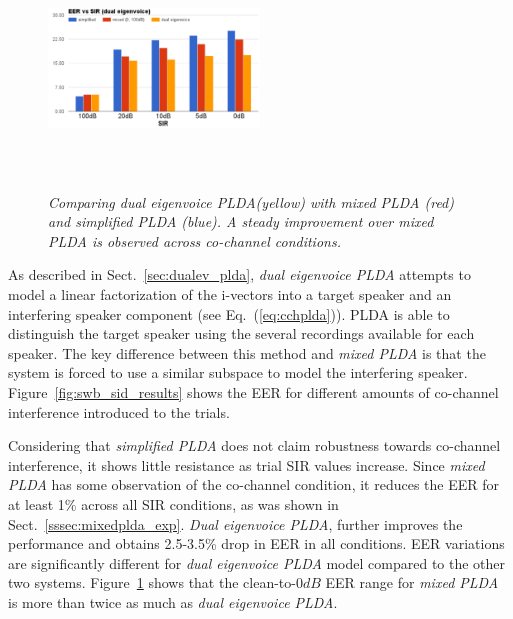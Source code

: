 \begin{figure}[b!]
	\centering
	\includegraphics[height = 2.5in, width=0.5\textwidth]{figures/eer_vs_sir_dualeigenvoice}
	\vspace{-2mm}
	\caption{\it \small Comparing {\it dual eigenvoice PLDA}(yellow) with {\it mixed PLDA} (red) and {\it simplified PLDA} (blue). A steady improvement over {\it mixed PLDA} is observed across co-channel conditions. }
	\label{fig:eer_dualeigenvoice}
	\vspace{-1mm}
\end{figure}

As described in Sect.~\ref{sec:dualev_plda}, {\it dual eigenvoice PLDA} attempts to model a linear factorization of the i-vectors into a target speaker and an interfering speaker component (see Eq.~(\ref{eq:cchplda})). 
PLDA is able to distinguish the target speaker using the several recordings available for each speaker. 
The key difference between this method and {\it mixed PLDA} is that the system is forced to use a similar subspace to model the interfering speaker. 
Figure~\ref{fig:swb_sid_results} shows the EER for different amounts of co-channel interference introduced to the trials. 

Considering that {\it simplified PLDA} does not claim robustness towards co-channel interference, it shows little resistance as trial SIR values increase. 
Since {\it mixed PLDA} has some observation of the co-channel condition, it reduces the EER for at least 1\% across all SIR conditions, as was shown in Sect.~\ref{sssec:mixedplda_exp}. {\it Dual eigenvoice PLDA}, further improves the performance and obtains 2.5-3.5\% drop in EER in all conditions. EER variations are significantly different for {\it dual eigenvoice PLDA} model compared to the other two systems. 
Figure~\ref{fig:eer_dualeigenvoice} shows that the clean-to-$0dB$ EER range for {\it mixed PLDA} is more than twice as much as {\it dual eigenvoice PLDA}. 



